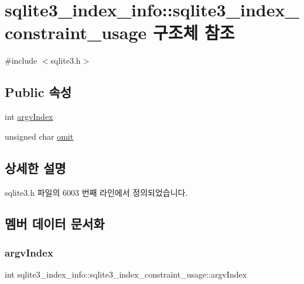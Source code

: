 \hypertarget{structsqlite3__index__info_1_1sqlite3__index__constraint__usage}{}\section{sqlite3\+\_\+index\+\_\+info\+:\+:sqlite3\+\_\+index\+\_\+constraint\+\_\+usage 구조체 참조}
\label{structsqlite3__index__info_1_1sqlite3__index__constraint__usage}


{\ttfamily \#include $<$sqlite3.\+h$>$}

\subsection*{Public 속성}
\begin{DoxyCompactItemize}
\item 
int \hyperlink{structsqlite3__index__info_1_1sqlite3__index__constraint__usage_a2cbf680033c2937b3de226e091743a94}{argv\+Index}
\item 
unsigned char \hyperlink{structsqlite3__index__info_1_1sqlite3__index__constraint__usage_ad07fa17d30e4fb3abe23ceaf84edf0ef}{omit}
\end{DoxyCompactItemize}


\subsection{상세한 설명}


sqlite3.\+h 파일의 6003 번째 라인에서 정의되었습니다.



\subsection{멤버 데이터 문서화}
\mbox{\label{structsqlite3__index__info_1_1sqlite3__index__constraint__usage_a2cbf680033c2937b3de226e091743a94}} 
\subsubsection{\texorpdfstring{argv\+Index}{argvIndex}}
{\footnotesize\ttfamily int sqlite3\+\_\+index\+\_\+info\+::sqlite3\+\_\+index\+\_\+constraint\+\_\+usage\+::argv\+Index}



